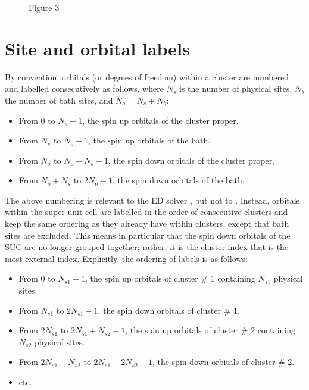 \documentclass[letterpaper,10pt,english]{sphinxmanual}
\let\sphinxpxdimen\pdfpxdimen\else\newdimen\sphinxpxdimen
\begin{document}
\begin{figure}[htbp]
\centering
\capstart

\noindent\sphinxincludegraphics[height=200\sphinxpxdimen]{{h4-6b}.png}
\caption{Figure 3}\label{\detokenize{models:id3}}\end{figure}


\section{Site and orbital labels}
\label{\detokenize{models:site-and-orbital-labels}}
\sphinxAtStartPar
By convention, orbitals (or degrees of freedom) within a cluster are numbered and labelled consecutively as follows, where \(N_s\) is the number of physical sites, \(N_b\) the number of bath sites, and \(N_o=N_s+N_b\):
\begin{itemize}
\item {} 
\sphinxAtStartPar
From 0 to \(N_s-1\), the spin up orbitals of the cluster proper.

\item {} 
\sphinxAtStartPar
From \(N_s\) to \(N_o-1\), the spin up orbitals of the bath.

\item {} 
\sphinxAtStartPar
From \(N_o\) to \(N_o+N_s-1\), the spin down orbitals of the cluster proper.

\item {} 
\sphinxAtStartPar
From \(N_o+N_s\) to \(2N_o-1\), the spin down orbitals of the bath.

\end{itemize}

\sphinxAtStartPar
The above numbering is relevant to the ED solver , but not to . Instead, orbitals within the super unit cell are labelled in the order of consecutive clusters and keep the same ordering as they already have within clusters, except that bath sites are excluded.
This means in particular that the spin down orbitals of the SUC are no longer grouped together; rather, it is the cluster index that is the most external index.
Explicitly, the ordering of labels is as follows:
\begin{itemize}
\item {} 
\sphinxAtStartPar
From 0 to \(N_{s1}-1\), the spin up orbitals of cluster \# 1 containing \(N_{s1}\) physical sites.

\item {} 
\sphinxAtStartPar
From \(N_{s1}\) to \(2N_{s1}-1\), the spin down orbitals of cluster \# 1.

\item {} 
\sphinxAtStartPar
From \(2N_{s1}\) to \(2N_{s1}+N_{s2}-1\), the spin up orbitals of cluster \# 2 containing \(N_{s2}\) physical sites.

\item {} 
\sphinxAtStartPar
From \(2N_{s1}+N_{s2}\) to \(2N_{s1}+2N_{s2}-1\), the spin down orbitals of cluster \# 2.

\item {} 
\sphinxAtStartPar
etc.

\end{itemize}
\end{document}
